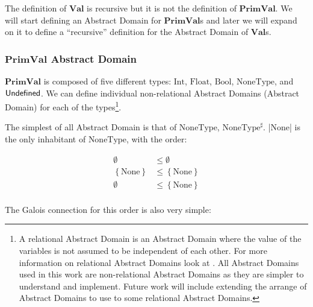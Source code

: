 %

The definition of \(\mathbf{Val}\) is recursive but it is not the definition of
\(\mathbf{PrimVal}\). We will start defining an Abstract Domain for \(\mathbf{PrimVal}\)s
and later we will expand on it to define a \enquote{recursive} definition for the Abstract
Domain of \(\mathbf{Val}\)s.

\subsubsection*{\texorpdfstring{\(\mathbf{PrimVal}\) Abstract
Domain}{PrimVal Abstract Domain}}\label{primval-abstract-domain}

\(\mathbf{PrimVal}\) is composed of five different types: \(\text{Int}\),
\(\text{Float}\), \(\text{Bool}\), \(\text{NoneType}\), and \(\mathsf{Undefined}\). We can define
individual non-relational Abstract Domains (Abstract Domain) for each of the types\footnote{%
  A relational Abstract Domain is an Abstract Domain where the value of the variables is
  not assumed to be independent of each other. For more information on relational Abstract
  Domains look at \textcite{mine_weakly_2004}. All Abstract Domains used in this work are
  non-relational Abstract Domains as they are simpler to understand and implement. Future
  work will include extending the arrange of Abstract Domains to use to some relational
  Abstract Domains.}.

The simplest of all Abstract Domain is that of \(\text{NoneType}\), \(\text{NoneType}^\sharp\). \pycode|None| is
the only inhabitant of \(\text{NoneType}\), with the order:

\[\begin{array}{rl}
  \emptyset &\le \emptyset \\
  \left\{\text{None}\right\} &\le \left\{\text{None}\right\} \\
  \emptyset &\le \left\{\text{None}\right\} \\
\end{array}\]

The Galois connection for this order is also very simple:

